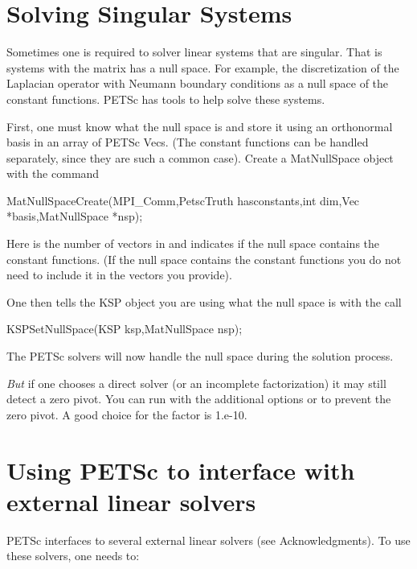\section{Solving Singular Systems}
\label{sec_singular}

Sometimes one is required to solver linear systems that are singular. 
That is systems with the matrix has a null space. For example, the 
discretization of the Laplacian operator with Neumann boundary conditions
as a null space of the constant functions. PETSc has tools to help
solve these systems.

First, one must know what the null space is and store it using an orthonormal basis 
in an array of PETSc Vecs. (The constant functions can be handled separately, since
they are such a common case). Create a MatNullSpace object with the command
\begin{tabbing}
MatNullSpaceCreate(MPI\_Comm,PetscTruth hasconstants,int dim,Vec *basis,MatNullSpace *nsp);
\end{tabbing}
Here  is the number of vectors in  and  indicates
if the null space contains the constant functions. (If the null space contains the constant
functions you do not need to include it in the  vectors you provide).

One then tells the KSP object you are using what the null space is with the call
\begin{tabbing}
KSPSetNullSpace(KSP ksp,MatNullSpace nsp);
\end{tabbing}
The PETSc solvers will now handle the null space during the solution process.

\emph{But} if one chooses a direct solver (or an incomplete factorization)
it may still detect a zero pivot. 
You can run with the additional options  
 or   to 
prevent the zero pivot. A good choice for the  factor is 1.e-10.

\section{Using PETSc to interface with external linear solvers}
\label{sec_externalsol}

PETSc interfaces to several external linear solvers (see Acknowledgments).
To use these solvers, one needs to:

